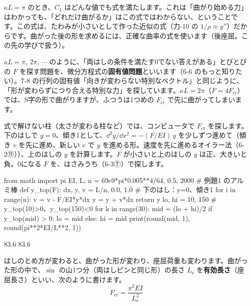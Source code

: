 \begin{seikaku}
$\kappa L=\pi$ のとき、$C_1$ はどんな値でも式を満たします。これは「曲がり始める力」はわかっても、「どれだけ曲がるか」はこの式ではわからない、ということです。この式は、たわみが小さいとして作った近似の式（力-10 の $1/\rho\approx y''$）だからです。曲がった後の形を求めるには、正確な曲率の式を使います（後座屈。この先の学びで扱う）。
\end{seikaku}

$\kappa L=\pi,\ 2\pi,\ \cdots$ のように、「両はしの条件を満たす0でない答えがある」とびとびの $F$ を探す問題を、微分方程式の\textbf{固有値問題}といいます（6-6 のもっと知りたい）。7-8 の行列の固有値「向きが変わらない特別なベクトル」と同じように、「形が変わらずにつり合える特別な力」を探しています。$\kappa L=2\pi$（$F=4F_{\mathrm{cr}}$）では、S字の形で曲がりますが、ふつうは1つめの $F_{\mathrm{cr}}$ で先に曲がってしまいます。

式で解けない柱（太さが変わる柱など）では、コンピュータで $F_{\mathrm{cr}}$ を探します。下のはしで $y=0$、傾き1として、$\dd^2y/\dd x^2=-(F/EI)\,y$ を少しずつ進めて（傾き $v$ を先に進め、新しい $v$ で $y$ を進める形。速度を先に進めるオイラー法（6-2⑪））、上のはしの $y$ を計算します。$F$ が小さいと上のはしの $y$ は正、大きいと負。0になる $F$ を、はさみうち（6-3⑦）で探します。
\begin{phcode}
from math import pi
EI, L, n = 69e9*pi*0.005**4/64, 0.5, 2000   \# 例題1 のアルミ棒
def y\_top(F):
    dx, y, v = L/n, 0.0, 1.0      \# 下のはし：y=0、傾き1
    for i in range(n):
        v = v - F/EI*y*dx
        y = y + v*dx
    return y
lo, hi = 10, 150                  \# y\_top(10)>0、y\_top(150)<0
for k in range(30):
    mid = (lo + hi)/2
    if y\_top(mid) > 0: lo = mid
    else: hi = mid
print(round(mid, 1), round(pi**2*EI/L**2, 1))
\end{phcode}
\begin{phcodeout}
83.6 83.6
\end{phcodeout}

はしのとめ方が変わると、曲がった形が変わり、座屈荷重も変わります。曲がった形の中で、$\sin$ の山1つ分（両はしピンと同じ形）の長さ $L_{\mathrm e}$ を\textbf{有効長さ}（座屈長さ）といい、次のように書けます。
\[F_{\mathrm{cr}}=\frac{\pi^2EI}{L_{\mathrm e}^2}\]

